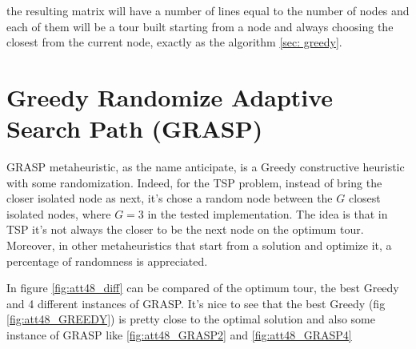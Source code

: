 the resulting matrix will have a number of lines equal to the number of nodes and each of them will be a tour built starting from a node and always choosing the closest from the current node, exactly as the algorithm \ref{sec: greedy}.

\section{Greedy Randomize Adaptive Search Path (GRASP)}
GRASP metaheuristic, as the name anticipate, is a Greedy constructive heuristic with some randomization. Indeed, for the TSP problem, instead of bring the closer isolated node as next, it's chose a random node between the $ G $ closest isolated nodes, where $ G = 3 $ in the tested implementation.
The idea is that in TSP it's not always the closer to be the next node on the optimum tour. Moreover, in other metaheuristics that start from a solution and optimize it, a percentage of randomness is appreciated.

In figure \ref{fig:att48_diff} can be compared of the optimum tour, the best Greedy and 4 different instances of GRASP. It's nice to see that the best Greedy (fig \ref{fig:att48_GREEDY}) is pretty close to the optimal solution and also some instance of GRASP like \ref{fig:att48_GRASP2} and \ref{fig:att48_GRASP4}

